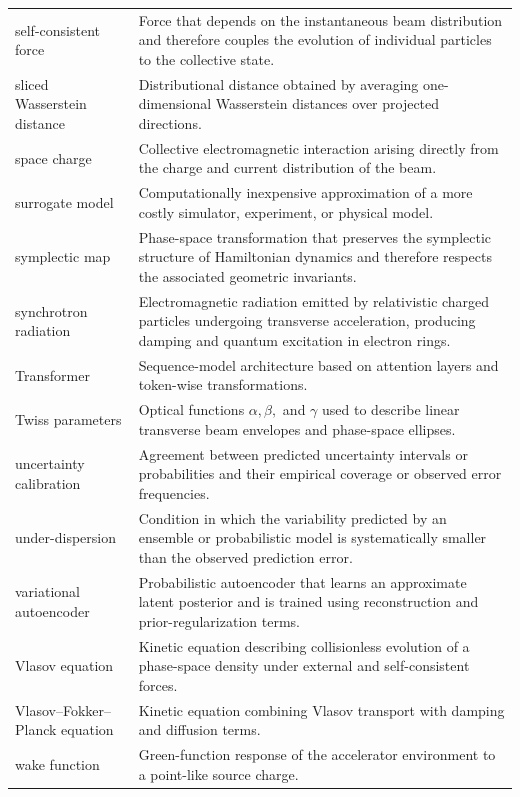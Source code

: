 \begin{longtable}{@{}p{}@{}p{}@{}}
\noalign{\vskip\baselineskip}
self-consistent force & Force that depends on the instantaneous beam distribution and therefore couples the evolution of individual particles to the collective state.\\
sliced Wasserstein distance & Distributional distance obtained by averaging one-dimensional Wasserstein distances over projected directions.\\
space charge & Collective electromagnetic interaction arising directly from the charge and current distribution of the beam.\\
surrogate model & Computationally inexpensive approximation of a more costly simulator, experiment, or physical model.\\
symplectic map & Phase-space transformation that preserves the symplectic structure of Hamiltonian dynamics and therefore respects the associated geometric invariants.\\
synchrotron radiation & Electromagnetic radiation emitted by relativistic charged particles undergoing transverse acceleration, producing damping and quantum excitation in electron rings.\\
\noalign{\vskip\baselineskip}
Transformer & Sequence-model architecture based on attention layers and token-wise transformations.\\
Twiss parameters & Optical functions \(\alpha , \beta ,\) and \(\gamma\) used to describe linear transverse beam envelopes and phase-space ellipses.\\
\noalign{\vskip\baselineskip}
uncertainty calibration & Agreement between predicted uncertainty intervals or probabilities and their empirical coverage or observed error frequencies.\\
under-dispersion & Condition in which the variability predicted by an ensemble or probabilistic model is systematically smaller than the observed prediction error.\\
\noalign{\vskip\baselineskip}
variational autoencoder & Probabilistic autoencoder that learns an approximate latent posterior and is trained using reconstruction and prior-regularization terms.\\
Vlasov equation & Kinetic equation describing collisionless evolution of a phase-space density under external and self-consistent forces.\\
Vlasov–Fokker–Planck equation & Kinetic equation combining Vlasov transport with damping and diffusion terms.\\
\noalign{\vskip\baselineskip}
wake function & Green-function response of the accelerator environment to a point-like source charge.\\

\end{longtable}
